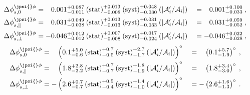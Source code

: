 \begin{alignat}{2}
\Delta\phi^{\jpsi{}\phi}_{s,0} & =
\phantom{-}0.001^{+0.087}_{-0.011}\:\text{(stat)}^{+0.013}_{-0.008}\:\text{(syst)}^{+0.048}_{-0.030}\:(|\mathcal{A}'_i/\mathcal{A}_i|)
&& = \phantom{-}0.001^{+0.100}_{-0.033}\:,\\
%
\Delta\phi^{\jpsi{}\phi}_{s,\parallel} & =
\phantom{-}0.031^{+0.049}_{-0.038}\:\text{(stat)}^{+0.013}_{-0.013}\:\text{(syst)}^{+0.031}_{-0.033}\:(|\mathcal{A}'_i/\mathcal{A}_i|)
&& = \phantom{-}0.031^{+0.059}_{-0.052}\:,\\
%
\Delta\phi^{\jpsi{}\phi}_{s,\perp} & =
-0.046^{+0.012}_{-0.012}\:\text{(stat)}^{+0.007}_{-0.008}\:\text{(syst)}^{+0.017}_{-0.024}\:(|\mathcal{A}'_i/\mathcal{A}_i|)
&& = -0.046^{+0.022}_{-0.028}\:,
\end{alignat}
\begin{alignat}{2}
\Delta\phi^{\jpsi{}\phi}_{s,0} & =
\phantom{-}\left(0.1^{+5.0}_{-0.6}\:\text{(stat)}^{+0.7}_{-0.5}\:\text{(syst)}^{+2.7}_{-1.7}\:(|\mathcal{A}'_i/\mathcal{A}_i|)\right)^{\circ}
&& = \phantom{-}\left(0.1^{+5.7}_{-1.9}\right)^{\circ}\:,\\
%
\Delta\phi^{\jpsi{}\phi}_{s,\parallel} & =
\phantom{-}\left(1.8^{+2.8}_{-2.2}\:\text{(stat)}^{+0.7}_{-0.7}\:\text{(syst)}^{+1.8}_{-1.9}\:(|\mathcal{A}'_i/\mathcal{A}_i|)\right)^{\circ}
&& = \phantom{-}\left(1.8^{+3.4}_{-3.0}\right)^{\circ}\:,\\
%
\Delta\phi^{\jpsi{}\phi}_{s,\perp} & =
-\left(2.6^{+0.7}_{-0.7}\:\text{(stat)}^{+0.5}_{-0.4}\:\text{(syst)}^{+1.4}_{-1.0}\:(|\mathcal{A}'_i/\mathcal{A}_i|)\right)^{\circ}
&& = -\left(2.6^{+1.6}_{-1.3}\right)^{\circ}\:.
\end{alignat}
